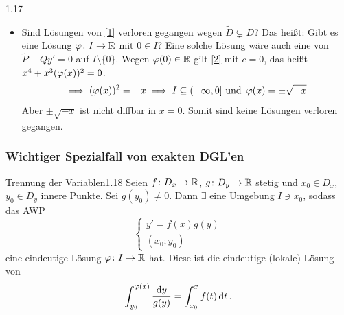 \documentclass[a4paper]{article}
\begin{document}
\begin{Beispiel}{}{1.17}
\begin{itemize}
\begin{center}
\begin{minipage}{0.35\linewidth}
\end{minipage}
\begin{minipage}{0.2\linewidth}
\centering
$\tilde{P}(x_0,0)\ne 0\implies$ $\exists_!$ Umkehrfunktion aus Bemerkung \ref{Bem:1.16} (a):
\end{minipage}
\begin{minipage}{0.35\linewidth}
\centering
{}
\end{minipage}
\end{center}
\item Sind Lösungen von \eqref{1} verloren gegangen wegen $\tilde{D}\subsetneq D$? Das heißt: Gibt es eine Lösung $\operatorname{\varphi}\colon I\to \mathbb R$ mit $0\in I$?
Eine solche Lösung wäre auch eine von $\tilde{P}+\tilde{Q}y'=0$ auf $I\setminus\{0\}$. Wegen $\operatorname{\varphi}(0)\in\mathbb R$ gilt \eqref{2} mit $c=0$, das heißt $x^4+x^3(\operatorname{\varphi}(x))^2=0$.
\[\implies (\operatorname{\varphi}(x))^2=-x\implies I\subseteq (-\infty,0]\text{ und } \operatorname{\varphi}(x)=\pm \sqrt{-x}\]
Aber $\pm\sqrt{-x}$ ist nicht diffbar in $x=0$. Somit sind keine Lösungen verloren gegangen.
\end{itemize}
\end{Beispiel}

\subsubsection*{Wichtiger Spezialfall von exakten DGL'en}

\begin{Satz}{Trennung der Variablen}{1.18}
Seien $f\colon D_x\to\mathbb R$, $g\colon D_y\to \mathbb R$ stetig und $x_0\in D_x$, $y_0\in D_y$ innere Punkte. Sei $g(y_0)\ne 0$. Dann $\exists$ eine Umgebung $I\ni x_0$, sodass das AWP
\[\left\{\begin{array}{c}
y'=f(x)g(y)\\
(x_0;y_0)
\end{array}\right.\]
eine eindeutige Lösung $\operatorname{\varphi}\colon I\to \mathbb R$ hat. Diese ist die eindeutige (lokale) Lösung von
\[\int_{y_0}^{\operatorname{\varphi}(x)}\frac{\mathop{}\!\mathrm{d} y}{g(y)}=\int_{x_0}^xf(t)\mathop{}\!\mathrm{d} t\,.\]
\end{Satz}
\end{document}
